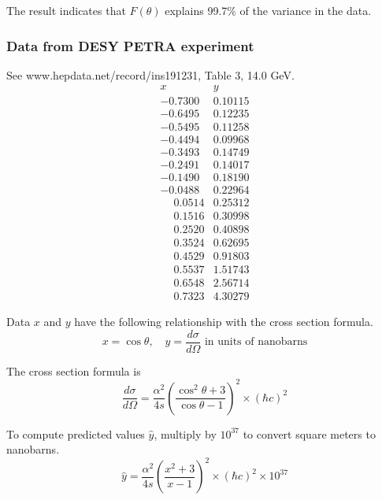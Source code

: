 The result indicates that $F(\theta)$ explains
99.7\% of the variance in the data.

\subsubsection*{Data from DESY PETRA experiment}
See www.hepdata.net/record/ins191231, Table 3, 14.0 GeV.
\begin{equation*}
\begin{matrix}
x & y\\
-0.7300 & 0.10115\\
-0.6495 & 0.12235\\
-0.5495 & 0.11258\\
-0.4494 & 0.09968\\
-0.3493 & 0.14749\\
-0.2491 & 0.14017\\
-0.1490 & 0.18190\\
-0.0488 & 0.22964\\
\phantom+0.0514 & 0.25312\\
\phantom+0.1516 & 0.30998\\
\phantom+0.2520 & 0.40898\\
\phantom+0.3524 & 0.62695\\
\phantom+0.4529 & 0.91803\\
\phantom+0.5537 & 1.51743\\
\phantom+0.6548 & 2.56714\\
\phantom+0.7323 & 4.30279
\end{matrix}
\end{equation*}

Data $x$ and $y$ have the following relationship with the cross section formula.
\begin{equation*}
x=\cos\theta,
\quad
y=\frac{d\sigma}{d\Omega}\text{ in units of nanobarns}
\end{equation*}

The cross section formula is
\begin{equation*}
\frac{d\sigma}{d\Omega}
=\frac{\alpha^2}{4s}
\left(\frac{\cos^2\theta+3}{\cos\theta-1}\right)^2\times(\hbar c)^2
\end{equation*}

To compute predicted values $\hat y$, multiply by $10^{37}$ to convert square meters to nanobarns.
\begin{equation*}
\hat y
=\frac{\alpha^2}{4s}
\left(\frac{x^2+3}{x-1}\right)^2
\times(\hbar c)^2
\times10^{37}
\end{equation*}

